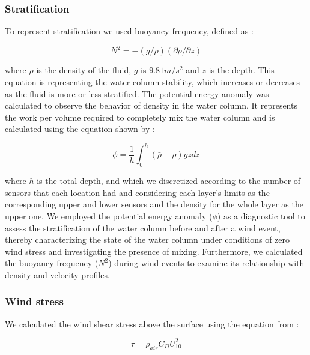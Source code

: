 \documentclass[tesis.tex]{subfiles}
\begin{document}
\subsubsection{Stratification}

To represent stratification we used buoyancy frequency, defined as \citep{kundu2002fluid}:

\begin{equation}
    N^2 = -(g/\rho)(\partial \rho/\partial z)
    \label{eq: N2}
\end{equation}

where $\rho$ is the density of the fluid, $g$ is $9.81 m/s^2$ and $z$ is the depth. This equation is representing the water column stability, which increases or decreases as the fluid is more or less stratified. The potential energy anomaly was calculated to observe the behavior of density in the water column. It represents the work per volume required to completely mix the water column and is calculated using the equation shown by \cite{simpson1990tidal}: 

\begin{equation}
    \phi=\frac{1}{h}\int^h_0(\bar{\rho}-\rho)gzdz
    \label{eq: phi}
\end{equation}

where $h$ is the total depth, and which we discretized according to the number of sensors that each location had and considering each layer's limits as the corresponding upper and lower sensors and the density for the whole layer as the upper one. We employed the potential energy anomaly ($\phi$) as a diagnostic tool to assess the stratification of the water column before and after a wind event, thereby characterizing the state of the water column under conditions of zero wind stress and investigating the presence of mixing. Furthermore, we calculated the buoyancy frequency ($N^2$) during wind events to examine its relationship with density and velocity profiles.

\subsubsection{Wind stress}

We calculated the wind shear stress above the surface using the equation from \cite{read2011derivation}: 

\begin{equation}
    \tau=\rho_{air} C_D U_{10}^2
    \label{eq: tau}
\end{equation}
\end{document}
